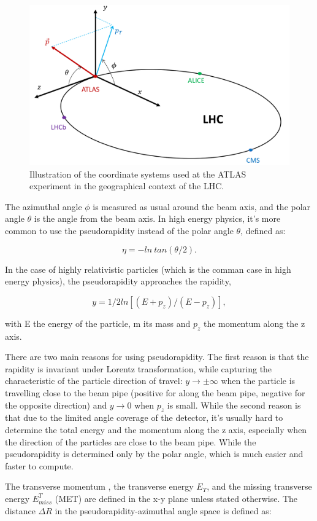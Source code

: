 \documentclass[letterpaper,12pt]{article}
\begin{document}
	\begin{figure}[bht]
		\begin{centering}	
		\includegraphics[width=.55\textwidth]{Detector_plots/ATLAS coordinate system.png}
		\caption{Illustration of the coordinate systems 
		used at the ATLAS experiment in the geographical context of the LHC.
			}
		\label{fig:ATLAS_coordinate_system}
		\end{centering}
	\end{figure}

	The azimuthal angle $\phi$ 
	is measured as usual around the beam axis, and 
	the polar angle $\theta$ is the angle from the beam axis.  
	In high energy physics, it's more common to use the 
	pseudorapidity instead of the
	polar angle $\theta$, defined as:

	\[ \eta = -ln\ tan(\theta/2). \]

	In the case of highly relativistic particles
	(which is the comman case in high energy physics), 
	the pseudorapidity approaches the rapidity, 

	\[ y=1/2ln[(E+p_z)/(E-p_z)], \]

	with E the energy of the particle, m its mass 
	and $p_z$ the momentum along the z axis.

	There are two main reasons for using pseudorapidity.
	The first reason is that the rapidity is invariant
	under Lorentz transformation, while capturing 
	the characteristic of the particle direction of travel:
	$y \rightarrow \pm \infty $ when the particle is  
	travelling close to the beam pipe (positive for along the
	beam pipe, negative for the opposite direction) and
	$y \rightarrow 0$ when $p_z$ is small.
	While the second reason is that due to the limited
	angle coverage of the detector, it's usually hard
	to determine the total energy and the momentum 
	along the z axis, especially when the direction of 
	the particles are close to the beam pipe. 
	While the pseudorapidity is determined only by
	the polar angle, which is much easier and faster 
	to compute. 

	The transverse momentum \pt, the transverse energy
	$E_T$, and the missing transverse energy $E_{miss}^T$ (MET) 
	are defined in the x-y plane unless stated otherwise.  
	The distance $\Delta R$ in the pseudorapidity-azimuthal angle 
	space is defined as:
\end{document}
